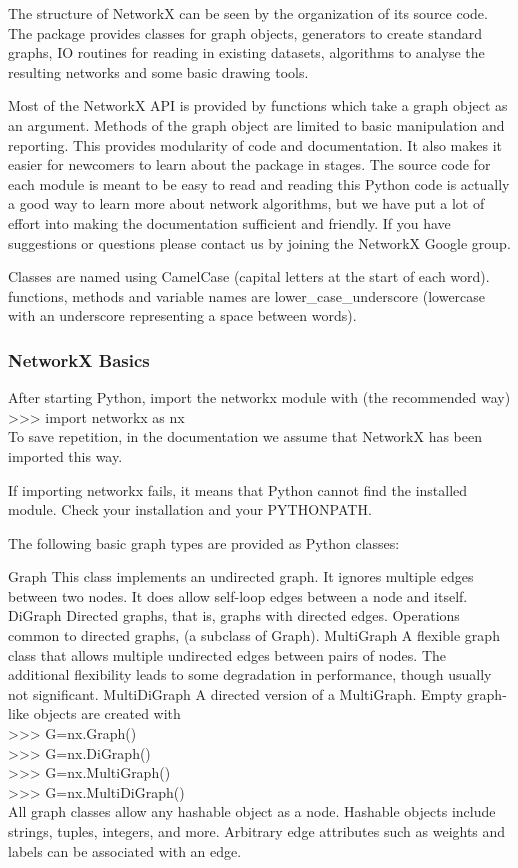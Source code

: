 The structure of NetworkX can be seen by the organization of its source code. The package provides classes for graph objects, generators to create standard graphs, IO routines for reading in existing datasets, algorithms to analyse the resulting networks and some basic drawing tools.

Most of the NetworkX API is provided by functions which take a graph object as an argument. Methods of the graph object are limited to basic manipulation and reporting. This provides modularity of code and documentation. It also makes it easier for newcomers to learn about the package in stages. The source code for each module is meant to be easy to read and reading this Python code is actually a good way to learn more about network algorithms, but we have put a lot of effort into making the documentation sufficient and friendly. If you have suggestions or questions please contact us by joining the NetworkX Google group.

Classes are named using CamelCase (capital letters at the start of each word). functions, methods and variable names are lower_case_underscore (lowercase with an underscore representing a space between words).
\subsubsection{NetworkX Basics}
After starting Python, import the networkx module with (the recommended way)\\

>>> import networkx as nx\\
To save repetition, in the documentation we assume that NetworkX has been imported this way.

If importing networkx fails, it means that Python cannot find the installed module. Check your installation and your PYTHONPATH.

The following basic graph types are provided as Python classes:

Graph
This class implements an undirected graph. It ignores multiple edges between two nodes. It does allow self-loop edges between a node and itself.
DiGraph
Directed graphs, that is, graphs with directed edges. Operations common to directed graphs, (a subclass of Graph).
MultiGraph
A flexible graph class that allows multiple undirected edges between pairs of nodes. The additional flexibility leads to some degradation in performance, though usually not significant.
MultiDiGraph
A directed version of a MultiGraph.
Empty graph-like objects are created with\\
>>> G=nx.Graph()\\
>>> G=nx.DiGraph()\\
>>> G=nx.MultiGraph()\\
>>> G=nx.MultiDiGraph()\\
All graph classes allow any hashable object as a node. Hashable objects include strings, tuples, integers, and more. Arbitrary edge attributes such as weights and labels can be associated with an edge.

